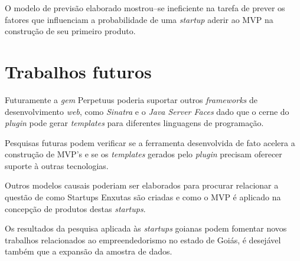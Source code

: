 O modelo de previs\~ao elaborado mostrou--se ineficiente na tarefa de prever os fatores que influenciam a probabilidade de uma \emph{startup} aderir ao MVP na constru\c{c}\~ao de seu primeiro produto.

\section{Trabalhos futuros}

Futuramente a \emph{gem} Perpetuus poderia suportar outros \emph{frameworks} de desenvolvimento \emph{web}, como \emph{Sinatra} e o \emph{Java Server Faces} dado que o cerne do \emph{plugin} pode gerar \emph{templates} para diferentes linguagens de programa\c{c}\~ao.

Pesquisas futuras podem verificar se a ferramenta desenvolvida de fato acelera a constru\c{c}\~ao de MVP's e se os \emph{templates} gerados pelo \emph{plugin} precisam oferecer suporte \`a outras tecnologias.

Outros modelos causais poderiam ser elaborados para procurar relacionar a quest\~ao de como Startups Enxutas s\~ao criadas e como o MVP \'e aplicado na concep\c{c}\~ao de produtos destas \emph{startups}.

Os resultados da pesquisa aplicada \`as \emph{startups} goianas podem fomentar novos trabalhos relacionados ao empreendedorismo no estado de Goi\'as, \'e desej\'avel tamb\'em que a expans\~ao da amostra de dados.